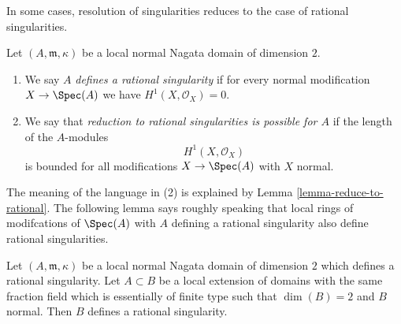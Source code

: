 \noindent
In some cases, resolution of singularities reduces to the case
of rational singularities.

\begin{definition}
\label{definition-reduce-to-rational}
Let $(A, \mathfrak m, \kappa)$ be a local normal Nagata domain
of dimension $2$.
\begin{enumerate}
\item We say $A$ {\it defines a rational singularity} if for every
normal modification $X \to \Spec(A)$ we have $H^1(X, \mathcal{O}_X) = 0$.
\item We say that {\it reduction to rational singularities
is possible for $A$} if the length of the $A$-modules
$$
H^1(X, \mathcal{O}_X)
$$
is bounded for all modifications $X \to \Spec(A)$ with $X$ normal.
\end{enumerate}
\end{definition}

\noindent
The meaning of the language in (2) is explained by
Lemma \ref{lemma-reduce-to-rational}. The following lemma
says roughly speaking that local rings of modifcations of $\Spec(A)$
with $A$ defining a rational singularity also define rational
singularities.

\begin{lemma}
\label{lemma-rational-propagates}
Let $(A, \mathfrak m, \kappa)$ be a local normal Nagata domain of
dimension $2$ which defines a rational singularity. Let $A \subset B$
be a local extension of domains with the same fraction field
which is essentially of finite type such
that $\dim(B) = 2$ and $B$ normal. Then $B$ defines a rational singularity.
\end{lemma}

